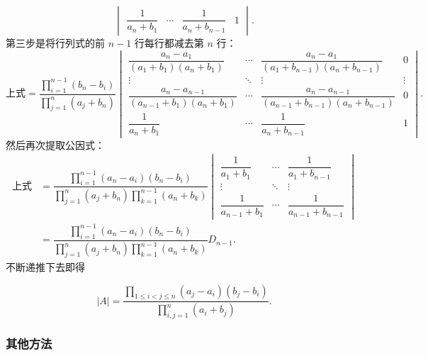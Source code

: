 \begin{solution}
\[\begin{vmatrix}
            \dfrac{1}{a_n+b_1}     & \cdots & \dfrac{1}{a_n+b_{n-1}}     & 1
        \end{vmatrix}. \]
    第三步是将行列式的前 $n-1$ 行每行都减去第 $n$ 行：
    \[ \text{上式} = \dfrac{\prod\limits_{i=1}^{n-1}(b_n-b_i)}{\prod\limits_{j=1}^{n}(a_j+b_n)}
        \begin{vmatrix}
            \dfrac{a_n-a_1}{(a_1+b_1)(a_n+b_1)}         & \cdots & \dfrac{a_n-a_1}{(a_1+b_{n-1})(a_n+b_{n-1})}         & 0      \\[2ex]
            \vdots                                      & \ddots & \vdots                                              & \vdots \\[2ex]
            \dfrac{a_n-a_{n-1}}{(a_{n-1}+b_1)(a_n+b_1)} & \cdots & \dfrac{a_n-a_{n-1}}{(a_{n-1}+b_{n-1})(a_n+b_{n-1})} & 0      \\[2ex]
            \dfrac{1}{a_n+b_1}                          & \cdots & \dfrac{1}{a_n+b_{n-1}}                              & 1
        \end{vmatrix}. \]
    然后再次提取公因式：
    \begin{align*}
        \text{上式} & = \dfrac{\prod\limits_{i=1}^{n-1}(a_n-a_i)(b_n-b_i)}{\prod\limits_{j=1}^{n}(a_j+b_n)\prod\limits_{k=1}^{n-1}(a_n+b_k)}
        \begin{vmatrix}
            \dfrac{1}{a_1+b_1}     & \cdots & \dfrac{1}{a_1+b_{n-1}}     \\[2ex]
            \vdots                 & \ddots & \vdots                     \\[2ex]
            \dfrac{1}{a_{n-1}+b_1} & \cdots & \dfrac{1}{a_{n-1}+b_{n-1}}
        \end{vmatrix}                                                         \\[2ex]
                    & = \dfrac{\prod\limits_{i=1}^{n-1}(a_n-a_i)(b_n-b_i)}{\prod\limits_{j=1}^{n}(a_j+b_n)\prod\limits_{k=1}^{n-1}(a_n+b_k)} D_{n-1}.
    \end{align*}
    不断递推下去即得

    \[|A| = \dfrac{\prod\limits_{1 \leqslant i < j \leqslant n}(a_j - a_i)(b_j - b_i)}{\prod\limits_{i,j=1}^{n}(a_i + b_j)}.\]
\end{solution}

\subsubsection{其他方法}

